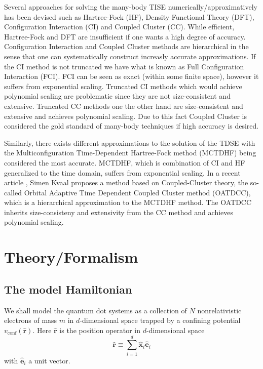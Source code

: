 \documentclass[aip,jcp,reprint,floatfix]{revtex4-1}
\begin{document}
Several approaches for solving the many-body TISE
numerically/approximatively has been devised such as Hartree-Fock
(HF), Density Functional Theory (DFT), Configuration Interaction (CI)
and Coupled Cluster (CC). While efficient, Hartree-Fock and DFT are
insufficient if one wants a high degree of accuracy. Configuration
Interaction and Coupled Cluster methods are hierarchical in the sense
that one can systematically construct increasly accurate
approximations. If the CI method is not truncated we have what is
known as Full Configuration Interaction (FCI). FCI can be seen as
exact (within some finite space), however it suffers from exponential
scaling. Truncated CI methods which would achieve polynomial scaling
are problematic since they are not size-consistent and
extensive. Truncated CC methods one the other hand are size-consistent
and extensive and achieves polynomial scaling. Due to this fact
Coupled Cluster is considered the gold standard of many-body
techniques if high accuracy is desired.

Similarly, there exists different approximations to the solution of
the TDSE with the Multiconfiguration Time-Dependent Hartree-Fock
method (MCTDHF) being considered the most accurate. MCTDHF, which is
combination of CI and HF generalized to the time domain, suffers from
exponential scaling. In a recent article \cite{Kvaal12}, Simen Kvaal
proposes a method based on Coupled-Cluster theory, the so-called
Orbital Adaptive Time Dependent Coupled Cluster method (OATDCC), which
is a hierarchical approximation to the MCTDHF method. The OATDCC
inherits size-consisteny and extensivity from the CC method and
achieves polynomial scaling.

\section{Theory/Formalism}
\subsection{The model Hamiltonian}
We shall model the quantum dot systems as a collection of $N$
nonrelativistic electrons of mass $m$ in $d$-dimensional space trapped
by a confining potential $v_{\text{conf}}(\mathbf{\hat{r}})$. Here
$\hat{\mathbf{r}}$ is the position operator in $d$-dimensional space
\begin{equation}
 \hat{\mathbf{r}} \equiv \sum_{i=1}^d \hat{\mathbf{x}}_i \hat{\mathbf{e}}_i
\end{equation}
with $\hat{\mathbf{e}}_i$ a unit vector.
\end{document}
